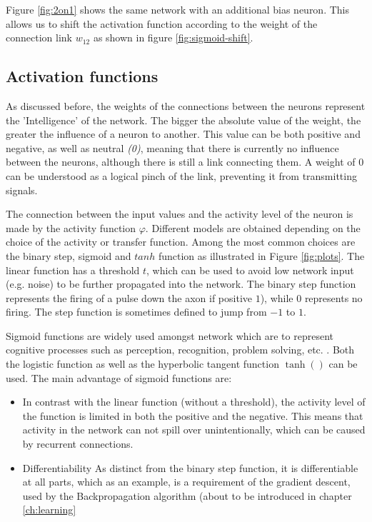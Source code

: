 \documentclass[10pt,a4paper,DIV=11]{scrreprt}
\begin{document}
Figure \ref{fig:2on1} shows the same network with an additional bias neuron. This allows us to shift the activation function according to the weight of the connection link $w_{12}$ as shown in figure \ref{fig:sigmoid-shift}.

\subsection{Activation functions}

As discussed before, the weights of the connections between the neurons represent the 'Intelligence' of the network. The bigger the absolute 
value of the weight, the greater the influence of a neuron to another. This value can be both positive and negative, as well as 
neutral \textit{(0)}, meaning that there is currently no influence between the neurons, although there is still a link connecting them. 
A weight of 0 can be understood as a logical pinch of the link, preventing it from transmitting signals.


The connection between the input values and the activity level of the neuron is made by the activity function $\varphi$. Different models are 
obtained depending on the choice of the activity or transfer function. Among the most common choices are the binary step, 
sigmoid and $tanh$ function as illustrated in Figure \ref{fig:plots}. The linear function has a threshold $t$, which can be used to avoid 
low network input (e.g. noise) to be further propagated into the network. The binary step function represents the firing of a pulse down the axon 
if positive $1$), while $0$ represents no firing. The step function is sometimes defined to jump from $-1$ to $1$. 

Sigmoid functions are widely used amongst network which are to represent cognitive processes such as perception, recognition, problem solving, 
etc. .
Both the logistic function as well as the hyperbolic tangent function $\tanh()$ can be used. The main advantage of sigmoid functions are:

\begin{itemize}
\item In contrast with the linear function (without a threshold), the activity level of the function is limited in both the positive and the negative. 
    This means that activity in the network can not spill over unintentionally, which can be caused by recurrent connections.
\item Differentiability
As distinct from the binary step function, it is differentiable at all parts, which as an example, is a requirement of the gradient descent, used by the Backpropagation algorithm 
(about to be introduced in chapter \ref{ch:learning}
\end{itemize}
\end{document}

